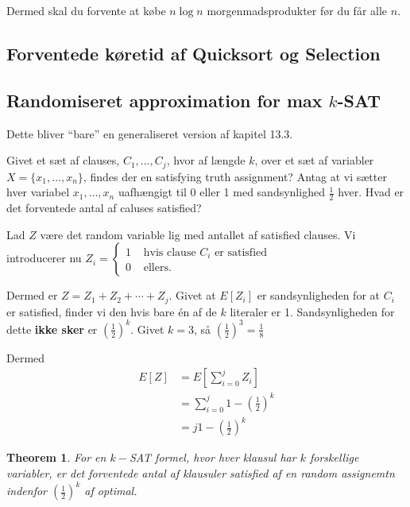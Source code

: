\documentclass[11pt]{article}
\newtheorem{theorem}{Theorem}
\theoremstyle{definition}
\theoremstyle{remark}
\begin{document}
Dermed skal du forvente at købe $n \log n$ morgenmadsprodukter før du får alle $n$. 

\subsection{Forventede køretid af Quicksort og Selection}
\label{subsec:label}


\subsection{Randomiseret approximation for max $k$-SAT}
\label{subsec:label}

Dette bliver ``bare'' en generaliseret version af kapitel 13.3.

Givet et sæt af clauses, $C_{1}, \ldots, C_{j}$, hvor af længde $k$, over et sæt af variabler $X = \{x_{1}, \ldots, x_{n}\}$, findes der en satisfying truth assignment?
Antag at vi sætter hver variabel $x_{1}, \ldots, x_{n}$ uafhængigt til 0 eller 1 med sandsynlighed $\frac{1}{2}$ hver. Hvad er det forventede antal af caluses satisfied?

Lad $Z$ være det random variable lig med antallet af satisfied clauses. Vi introducerer nu $Z_{i} = \begin{cases}
  1 & \text{ hvis clause }C_{i} \text{ er satisfied}\\
  0 & \text{ ellers}.
\end{cases}$

Dermed er $Z = Z_{1} + Z_{2} + \cdots + Z_{j}$. Givet at $E[Z_{i}]$ er sandsynligheden for at $C_{i}$ er satisfied, finder vi den hvis bare én af de $k$ literaler er 1. Sandsynligheden for dette \textbf{ikke sker} er $\left( \frac{1}{2} \right)^{k}$. Givet $k = 3$, så $\left( \frac{1}{2} \right)^{3} = \frac{1}{8}$

Dermed
\begin{equation}
\begin{split}
  E[Z] &=E[ \sum_{i=0}^{j} Z_{i} ]\\
       &= \sum_{i=0}^{j} 1-\left( \frac{1}{2} \right) ^{k}\\
  &= j 1-\left( \frac{1}{2} \right)^{k}
\end{split}
\end{equation}

\begin{theorem}
  \label{theorem:13.15}
For en $k-$SAT formel, hvor hver klausul har $k$ forskellige variabler, er det forventede antal af klausuler satisfied af en random assignemtn indenfor $(\frac{1}{2})^{k}$ af optimal.
\end{theorem}
\end{document}
